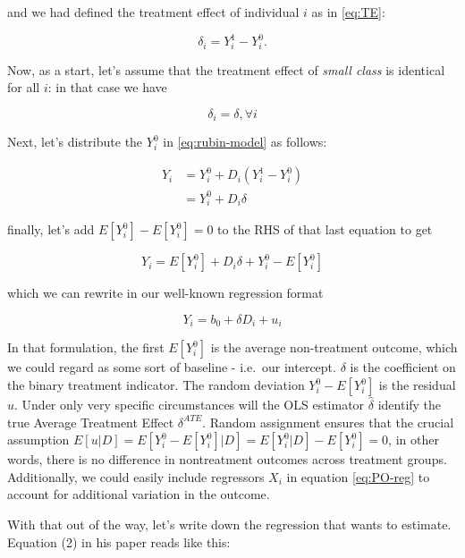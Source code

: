 \documentclass[]{book}
\begin{document}
and we had defined the treatment effect of individual \(i\) as in \eqref{eq:TE}:

\begin{equation*}
\delta_i = Y_i^1 - Y_i^0. 
\end{equation*}

Now, as a start, let's assume that the treatment effect of \emph{small class} is identical for all \(i\): in that case we have

\begin{equation*}
\delta_i = \delta ,\forall i
\end{equation*}

Next, let's distribute the \(Y_i^0\) in \eqref{eq:rubin-model} as follows:

\begin{align*}
Y_i &= Y_i^0 + D_i (Y_i^1 - Y_i^0 )\\
    &= Y_i^0 + D_i \delta  
\end{align*}

finally, let's add \(E[Y_i^0] - E[Y_i^0]=0\) to the RHS of that last equation to get

\begin{equation*}
Y_i = E[Y_i^0] + D_i \delta + Y_i^0 - E[Y_i^0]  
\end{equation*}

which we can rewrite in our well-known regression format

\begin{equation}
Y_i = b_0 + \delta D_i  + u_i  \label{eq:PO-reg}
\end{equation}

In that formulation, the first \(E[Y_i^0]\) is the average non-treatment outcome, which we could regard as some sort of baseline - i.e.~our intercept. \(\delta\) is the coefficient on the binary treatment indicator. The random deviation \(Y_i^0 - E[Y_i^0]\) is the residual \(u\). Under only very specific circumstances will the OLS estimator \(\hat{\delta}\) identify the true Average Treatment Effect \(\delta^{ATE}\). Random assignment ensures that the crucial assumption \(E[u|D] = E[Y_i^0 - E[Y_i^0]|D] = E[Y_i^0|D] - E[Y_i^0] = 0\), in other words, there is no difference in nontreatment outcomes across treatment groups. Additionally, we could easily include regressors \(X_i\) in equation \eqref{eq:PO-reg} to account for additional variation in the outcome.

With that out of the way, let's write down the regression that \citet{krueger1999} wants to estimate. Equation (2) in his paper reads like this:
\end{document}
